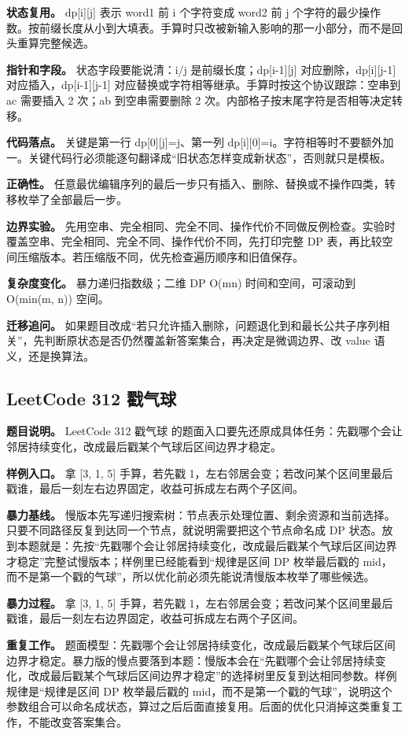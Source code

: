\textbf{状态复用。} dp[i][j] 表示 word1 前 i 个字符变成 word2 前 j 个字符的最少操作数。按前缀长度从小到大填表。手算时只改被新输入影响的那一小部分，而不是回头重算完整候选。

\textbf{指针和字段。} 状态字段要能说清：i/j 是前缀长度；dp[i-1][j] 对应删除，dp[i][j-1] 对应插入，dp[i-1][j-1] 对应替换或字符相等继承。手算时按这个协议跟踪：空串到 ac 需要插入 2 次；ab 到空串需要删除 2 次。内部格子按末尾字符是否相等决定转移。

\textbf{代码落点。} 关键是第一行 dp[0][j]=j、第一列 dp[i][0]=i。字符相等时不要额外加一。关键代码行必须能逐句翻译成“旧状态怎样变成新状态”，否则就只是模板。

\textbf{正确性。} 任意最优编辑序列的最后一步只有插入、删除、替换或不操作四类，转移枚举了全部最后一步。

\textbf{边界实验。} 先用空串、完全相同、完全不同、操作代价不同做反例检查。实验时覆盖空串、完全相同、完全不同、操作代价不同，先打印完整 DP 表，再比较空间压缩版本。若压缩版不同，优先检查遍历顺序和旧值保存。

\textbf{复杂度变化。} 暴力递归指数级；二维 DP O(mn) 时间和空间，可滚动到 O(min(m, n)) 空间。

\textbf{迁移追问。} 如果题目改成“若只允许插入删除，问题退化到和最长公共子序列相关”，先判断原状态是否仍然覆盖新答案集合，再决定是微调边界、改 value 语义，还是换算法。

\subsection{LeetCode 312 戳气球}

\textbf{题目说明。} LeetCode 312 戳气球 的题面入口要先还原成具体任务：先戳哪个会让邻居持续变化，改成最后戳某个气球后区间边界才稳定。

\textbf{样例入口。} 拿 [3, 1, 5] 手算，若先戳 1，左右邻居会变；若改问某个区间里最后戳谁，最后一刻左右边界固定，收益可拆成左右两个子区间。

\textbf{暴力基线。} 慢版本先写递归搜索树：节点表示处理位置、剩余资源和当前选择。只要不同路径反复到达同一个节点，就说明需要把这个节点命名成 DP 状态。放到本题就是：先按“先戳哪个会让邻居持续变化，改成最后戳某个气球后区间边界才稳定”完整试慢版本；样例里已经能看到“规律是区间 DP 枚举最后戳的 mid，而不是第一个戳的气球”，所以优化前必须先能说清慢版本枚举了哪些候选。

\textbf{暴力过程。} 拿 [3, 1, 5] 手算，若先戳 1，左右邻居会变；若改问某个区间里最后戳谁，最后一刻左右边界固定，收益可拆成左右两个子区间。

\textbf{重复工作。} 题面模型：先戳哪个会让邻居持续变化，改成最后戳某个气球后区间边界才稳定。暴力版的慢点要落到本题：慢版本会在“先戳哪个会让邻居持续变化，改成最后戳某个气球后区间边界才稳定”的选择树里反复到达相同参数。样例规律是“规律是区间 DP 枚举最后戳的 mid，而不是第一个戳的气球”，说明这个参数组合可以命名成状态，算过之后后面直接复用。后面的优化只消掉这类重复工作，不能改变答案集合。

